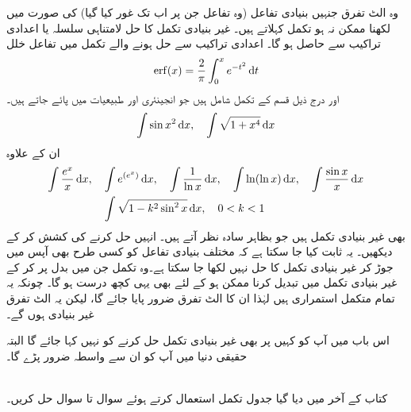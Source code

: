 وہ الٹ تفرق جنہیں بنیادی تفاعل (وہ تفاعل جن پر اب تک غور کیا گیا) کی صورت میں لکھنا ممکن نہ ہو  تکمل کہلاتے ہیں۔ غیر بنیادی تکمل کا حل لامتناہی سلسلہ  یا اعدادی تراکیب سے حاصل ہو گا۔ اعدادی تراکیب سے حل ہونے والے تکمل میں تفاعل خلل
\begin{align*}
\erf(x)=\frac{2}{\pi}\int_0^x e^{-t^2}\dif t
\end{align*}
اور درج ذیل قسم کے تکمل شامل ہیں جو انجینئری اور طبیعیات میں پائے جاتے ہیں۔
\begin{align*}
\int\sin x^2\dif x,\quad \int \sqrt{1+x^4}\dif x
\end{align*}
ان کے علاوہ
\begin{align*}
\int\frac{e^x}{x}\dif x,\quad &\int e^{(e^x)}\dif x,\quad \int\frac{1}{\ln x}\dif x,\quad \int \ln(\ln x)\dif x,\quad \int\frac{\sin x}{x}\dif x\\
&\int \sqrt{1-k^2\sin^2x}\dif x,\quad 0<k<1
\end{align*}
بھی غیر بنیادی تکمل ہیں جو بظاہر سادہ نظر آتے ہیں۔ انہیں حل کرنے کی کشش کر کے دیکھیں۔ یہ ثابت کیا جا سکتا ہے کہ مختلف بنیادی تفاعل کو کسی طرح بھی آپس میں جوڑ کر غیر بنیادی تکمل کا حل نہیں لکھا جا سکتا ہے۔وہ تکمل جن میں بدل پر کر کے غیر بنیادی تکمل میں تبدیل کرنا ممکن ہو کے لئے بھی یہی کچھ درست ہو گا۔ چونکہ یہ تمام متکمل استمراری ہیں لہٰذا ان کا الٹ تفرق ضرور پایا جائے گا، لیکن یہ الٹ تفرق غیر بنیادی ہوں گے۔ 

اس باب میں آپ کو کہیں پر بھی غیر بنیادی تکمل حل کرنے کو نہیں کہا جائے گا البتہ حقیقی دنیا میں آپ کو ان سے واسطہ ضرور پڑے گا۔

\\
کتاب کے آخر میں دیا گیا جدول تکمل استعمال کرتے ہوئے سوال  تا سوال  حل کریں۔

